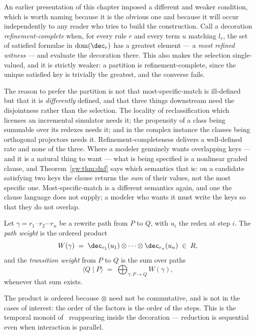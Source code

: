 \begin{remark}
\label{def:refcomplete}
An earlier presentation of this chapter imposed a different and weaker
condition, which is worth naming because it is the obvious one and
because it will occur independently to any reader who tries to build the
construction.  Call a decoration \emph{refinement-complete} when, for
every rule $r$ and every term $u$ matching $l_r$, the set of satisfied
formulae in $\mathrm{dom}(\dec_r)$ has a greatest element --- a
\emph{most refined witness} --- and evaluate the decoration there.  This
also makes the selection single-valued, and it is strictly weaker: a
partition is refinement-complete, since the unique satisfied key is
trivially the greatest, and the converse fails.

The reason to prefer the partition is not that most-specific-match is
ill-defined but that it is \emph{differently} defined, and that three
things downstream need the disjointness rather than the selection.  The
locality of reclassification which licenses an incremental simulator
needs it; the propensity of a class being summable over its redexes needs
it; and in the complex instance the classes being orthogonal projectors
needs it.  Refinement-completeness delivers a well-defined rate and none
of the three.  Where a modeler genuinely wants overlapping keys --- and it is a
natural thing to want --- what is being specified is a nonlinear graded
clause, and Theorem~\ref{gw:thm:dnf} says which semantics that is: on a
candidate satisfying two keys the clause returns the \emph{sum} of their
values, not the most specific one.  Most-specific-match is a different
semantics again, and one the clause language does not supply; a modeler
who wants it must write the keys so that they do not overlap.
\end{remark}

\begin{definition}
\label{def:pathweight}
Let $\gamma = r_1 \cdot r_2 \cdots r_n$ be a rewrite path from $P$ to $Q$,
with $u_i$ the redex at step $i$.  The \emph{path weight} is the ordered
product
\[
  W(\gamma) \;=\; \dec_{r_1}(u_1) \otimes \cdots \otimes \dec_{r_n}(u_n)
  \;\in\; R,
\]
and the \emph{transition weight} from $P$ to $Q$ is the sum over paths
\[
  \langle Q \mid P \rangle \;=\; \bigoplus_{\gamma : P \to Q} W(\gamma),
\]
whenever that sum exists.
\end{definition}

The product is ordered because $\otimes$ need not be commutative, and is
not in the cases of interest: the order of the factors is the order of the
steps.  This is the temporal monoid of~\cite[\S4]{CE} reappearing inside
the decoration --- reduction is sequential even when interaction is
parallel.


